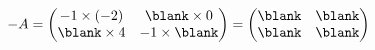 $-A=\begin{pmatrix} -1\times(-2) & \blank\times 0 \\ \blank\times 4 & -1\times\blank \end{pmatrix}=\begin{pmatrix} \blank & \blank \\ \blank & \blank \end{pmatrix}$

